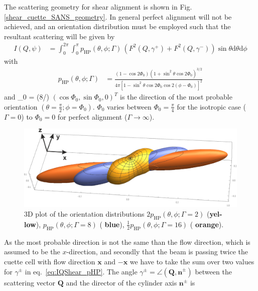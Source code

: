 The scattering geometry for shear alignment is shown in Fig.
\ref{shear_cuette_SANS_geometry}. In general perfect alignment
will not be achieved, and an orientation distribution must be
employed such that the resultant scattering will be given by
\begin{align}
I(Q,\psi) &= \int_0^{2\pi} \int_0^\pi
p_\mathrm{HP}(\theta,\phi;\Gamma)\, \left(F^2(Q,\gamma^+)+F^2(Q,\gamma^-)
\right) \sin\theta \mathrm{d}\theta \mathrm{d}\phi
\label{eq:IQShear_pHP}
\end{align}
with
\begin{align}
p_\mathrm{HP}(\theta,\phi;\Gamma) & = \frac{(1-\cos
2\varPhi_0)(1+\sin^2\theta\cos 2\varPhi_0)^{3/2}}{4\pi\left[
1-\sin^2\theta\cos 2\varPhi_0\cos 2(\phi-\varPhi_0)\right]^2}
\end{align}
and
\varPhi_0 = \arctan(8/\Gamma)
\EE
$(\cos \varPhi_0,\sin \varPhi_0,0)^T$
is the direction of the most probable orientation $(\theta=\frac{\pi}{2};\phi=\varPhi_0)$. $\varPhi_0$ varies between $\varPhi_0=\frac{\pi}{4}$ for the isotropic case ($\Gamma=0$)  to $\varPhi_0=0$ for perfect alignment ($\Gamma\rightarrow \infty$).
\begin{figure}[htb]
\begin{center}
\includegraphics[width=\textwidth]{../images/form_factor/cylindrical_obj/pHP3D.png}
\end{center}
\caption{3D plot of the orientation distributions $2 p_\mathrm{HP}(\theta,\phi;\Gamma={2})$ ({\bf \color[rgb]{1.0, 0.85, 0.0}yel-}{\bf \color[rgb]{1.0, 0.85, 0.0}low}), $p_\mathrm{HP}(\theta,\phi;\Gamma{=}8)$ ({\bf\color[rgb]{0.36, 0.57, 0.9} blue}), $\frac12 p_\mathrm{HP}(\theta,\phi;\Gamma{=}16)$ ({\bf\color[rgb]{1.0, 0.5, 0.0} orange}).} \label{fig:pHP3D}
\end{figure}
As the most probable direction is not the same than the flow direction, which is assumed to be the $x$-direction, and secondly that the beam is passing twice the cuette cell with flow direction $\mathbf{x}$ and $-\mathbf{x}$ we have to take the sum over two values for $\gamma^\pm$ in eq.\ \ref{eq:IQShear_pHP}. The angle $\gamma^\pm = \angle(\mathbf{Q,n}^\pm)$ between the scattering vector $\mathbf{Q}$ and the director of the cylinder axis $\mathbf{n}^\pm$ is
